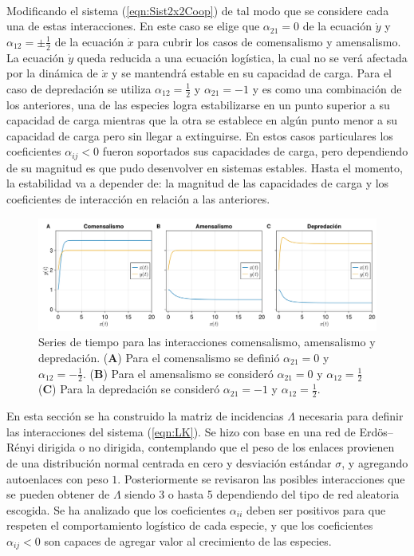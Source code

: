 \begin{ejemplo}
 	\\
 	Modificando el sistema (\ref{eqn:Sist2x2Coop}) de tal modo que se considere cada una de estas interacciones. En este caso se elige que $\alpha_{21}=0$ de la ecuación $\dot{y}$ y $\alpha_{12}=\pm\frac{1}{2}$ de la ecuación $\dot{x}$ para cubrir los casos de comensalismo y amensalismo. La ecuación $\dot{y}$ queda reducida a una ecuación logística, la cual no se verá afectada por la dinámica de $\dot{x}$ y se mantendrá estable en su capacidad de carga. 	Para el caso de depredación se utiliza $\alpha_{12}=\frac{1}{2}$ y $\alpha_{21}=-1$ y es como una combinación de los anteriores, una de las especies logra estabilizarse en un punto superior a su capacidad de carga mientras que la otra se establece en algún punto menor a su capacidad de carga pero sin llegar a extinguirse. En estos casos particulares los coeficientes $\alpha_{ij}<0$ fueron soportados sus capacidades de carga, pero dependiendo de su magnitud es que pudo desenvolver en sistemas estables. Hasta el momento, la estabilidad va a depender de: la magnitud de las capacidades de carga y los coeficientes de interacción en relación a las anteriores.
 	\begin{figure}[h!]
 		\centering
 		\includegraphics[scale=0.2]{../Imagenes/STrestoInteracciones}
 		\caption{Series de tiempo para las interacciones comensalismo, amensalismo y depredación. (\textbf{A}) Para el comensalismo se definió $\alpha_{21}=0$ y $\alpha_{12}=-\frac{1}{2}$. (\textbf{B}) Para el amensalismo se consideró $\alpha_{21}=0$ y $\alpha_{12}=\frac{1}{2}$ (\textbf{C}) Para la depredación se consideró $\alpha_{21}=-1$ y $\alpha_{12}=\frac{1}{2}$.}
 		\label{fig:RestoInteraccionesST}
 	\end{figure}
 	

\end{ejemplo}
En esta sección se ha construido la matriz de incidencias $\Lambda$ necesaria para definir las interacciones del sistema (\ref{eqn:LK}). Se hizo con base en una red de Erdös–Rényi dirigida o no dirigida, contemplando que el peso de los enlaces provienen de una distribución normal centrada en cero y desviación estándar $\sigma$, y agregando autoenlaces con peso $1$. Posteriormente se revisaron las posibles interacciones que se pueden obtener de $\Lambda$ siendo 3 o hasta 5 dependiendo del tipo de red aleatoria escogida. Se ha analizado que los coeficientes $\alpha_{ii}$ deben ser positivos para que respeten el comportamiento logístico de cada especie, y que los coeficientes $\alpha_{ij}<0$ son capaces de agregar valor al crecimiento de las especies. \\
